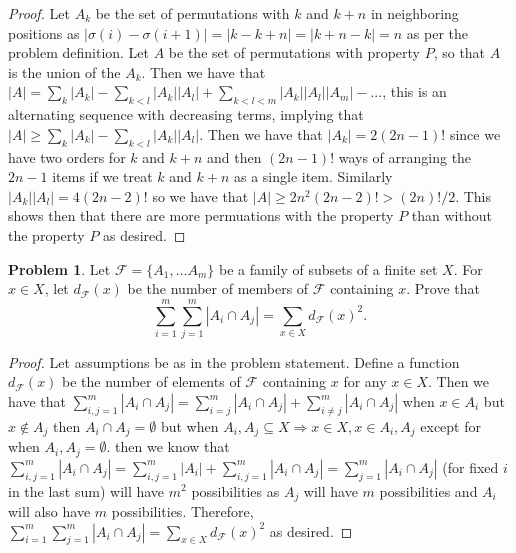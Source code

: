 \documentclass[11pt, letter]{amsart}
\theoremstyle{definition}
\newtheorem{problem}{Problem}[]
\newcommand\cF{{\mathcal F}}
\begin{document}
\begin{proof}
    Let $A_k$ be the set of permutations with $k$ and $k + n$ in neighboring positions as $|\sigma(i) - \sigma (i + 1)| = |k - k + n| = |k + n - k| = n$ as per the problem definition. Let $A$ be the set of permutations with property $P$, so that $A$ is the union of the $A_k$. Then we have that $|A| = \sum_{k}|A_k| - \sum_{k < l} |A_k||A_l| + \sum_{k < l < m} |A_k||A_l||A_m| - ...$, this is an alternating sequence with decreasing terms, implying that $|A| \geq \sum_{k}|A_k| - \sum_{k < l}|A_k||A_l|.$ Then we have that $|A_k| = 2(2n-1)!$ since we have two orders for $k$ and $k + n$ and then $(2n - 1)!$ ways of arranging the $2n-1$ items if we treat $k$ and $k + n$ as a single item. Similarly $|A_k||A_l| = 4(2n - 2)!$ so we have that $|A| \geq 2n^2(2n-2)! > (2n)!/2$. This shows then that there are more permuations with the property $P$ than without the property $P$ as desired.
\end{proof}
\clearpage
\begin{problem}
  Let $\cF = \{A_1, \dots A_m\}$ be a family of subsets of a finite set $X$.  For $x \in X$, let $d_\cF(x)$ be the number of members of $\cF$ containing $x$.  Prove that
  \begin{equation*}
    \sum_{i=1}^m\sum_{j=1}^m |A_i \cap A_j| = \sum_{x \in X}d_\cF(x)^2.
  \end{equation*}
\end{problem}
\begin{proof}
    Let assumptions be as in the problem statement. Define a function $d_{\cF}(x)$ be the number of elements of $\cF$ containing $x$ for any $x\in X$. Then we have that $\sum_{i, j = 1}^m |A_i \cap A_j| = \sum_{i = j}^m|A_i \cap A_j| + \sum_{i \neq j}^m |A_i \cap A_j|$ when $x \in A_i$ but $x \not\in A_j$ then $A_i \cap A_j = \emptyset$ but when $A_i, A_j \subseteq X \Rightarrow x\in X, x\in A_i, A_j$ except for when $A_i, A_j = \emptyset.$ then we know that $\sum_{i, j = 1}^m |A_i \cap A_j| = \sum_{i, j = 1}^m |A_i| + \sum_{i, j = 1}^m |A_i \cap A_j| = \sum_{j = 1}^m |A_i \cap A_j|$ (for fixed $i$ in the last sum) will have $m^2$ possibilities as $A_j$ will have $m$ possibilities and $A_i$ will also have $m$ possibilities. Therefore, $\sum_{i = 1}^m\sum_{j = 1}^m |A_i \cap A_j| = \sum_{x\in X} d_{\cF}(x)^2$ as desired.
\end{proof}
\end{document}
